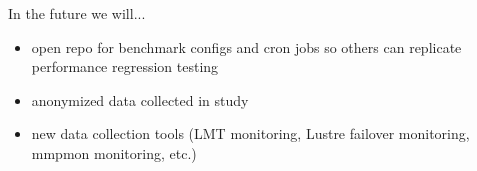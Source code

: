 In the future we will...

\begin{itemize}
\item open repo for benchmark configs and cron jobs so others can replicate
performance regression testing
\item anonymized data collected in study
\item new data collection tools (LMT monitoring, Lustre failover monitoring,
mmpmon monitoring, etc.)
\end{itemize}





